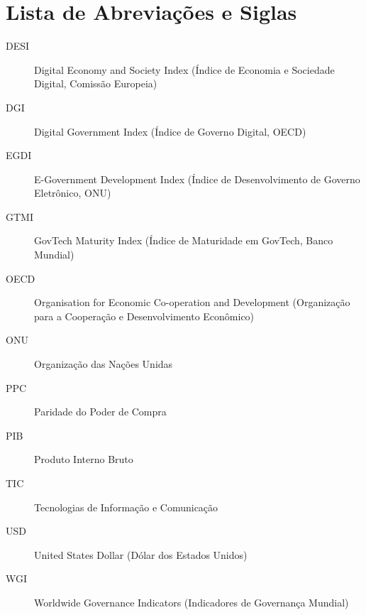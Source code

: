\chapter*{Lista de Abreviações e Siglas}

\begin{description}
    \item[DESI] Digital Economy and Society Index (Índice de Economia e Sociedade Digital, Comissão Europeia)
    \item[DGI] Digital Government Index (Índice de Governo Digital, OECD)
    \item[EGDI] E-Government Development Index (Índice de Desenvolvimento de Governo Eletrônico, ONU)
    \item[GTMI] GovTech Maturity Index (Índice de Maturidade em GovTech, Banco Mundial)
    \item[OECD] Organisation for Economic Co-operation and Development (Organização para a Cooperação e Desenvolvimento Econômico)
    \item[ONU] Organização das Nações Unidas
    \item[PPC] Paridade do Poder de Compra
    \item[PIB] Produto Interno Bruto
    \item[TIC] Tecnologias de Informação e Comunicação
    \item[USD] United States Dollar (Dólar dos Estados Unidos)
    \item[WGI] Worldwide Governance Indicators (Indicadores de Governança Mundial)
\end{description}